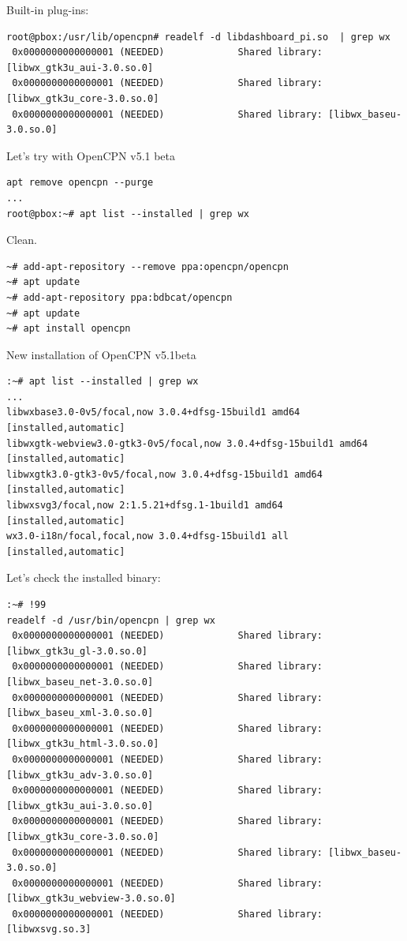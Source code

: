 \documentclass[11pt]{article}
\begin{document}
    Built-in plug-ins:

    \begin{verbatim}
root@pbox:/usr/lib/opencpn# readelf -d libdashboard_pi.so  | grep wx
 0x0000000000000001 (NEEDED)             Shared library: [libwx_gtk3u_aui-3.0.so.0]
 0x0000000000000001 (NEEDED)             Shared library: [libwx_gtk3u_core-3.0.so.0]
 0x0000000000000001 (NEEDED)             Shared library: [libwx_baseu-3.0.so.0]
\end{verbatim}

    Let's try with OpenCPN v5.1 beta

    \begin{verbatim}
apt remove opencpn --purge
...
root@pbox:~# apt list --installed | grep wx
\end{verbatim}

Clean.

    \begin{verbatim}
~# add-apt-repository --remove ppa:opencpn/opencpn
~# apt update
~# add-apt-repository ppa:bdbcat/opencpn
~# apt update
~# apt install opencpn
\end{verbatim}

    New installation of OpenCPN v5.1beta

    \begin{verbatim}
:~# apt list --installed | grep wx
...
libwxbase3.0-0v5/focal,now 3.0.4+dfsg-15build1 amd64 [installed,automatic]
libwxgtk-webview3.0-gtk3-0v5/focal,now 3.0.4+dfsg-15build1 amd64 [installed,automatic]
libwxgtk3.0-gtk3-0v5/focal,now 3.0.4+dfsg-15build1 amd64 [installed,automatic]
libwxsvg3/focal,now 2:1.5.21+dfsg.1-1build1 amd64 [installed,automatic]
wx3.0-i18n/focal,focal,now 3.0.4+dfsg-15build1 all [installed,automatic]
\end{verbatim}

    Let's check the installed binary:

    \begin{verbatim}
:~# !99
readelf -d /usr/bin/opencpn | grep wx
 0x0000000000000001 (NEEDED)             Shared library: [libwx_gtk3u_gl-3.0.so.0]
 0x0000000000000001 (NEEDED)             Shared library: [libwx_baseu_net-3.0.so.0]
 0x0000000000000001 (NEEDED)             Shared library: [libwx_baseu_xml-3.0.so.0]
 0x0000000000000001 (NEEDED)             Shared library: [libwx_gtk3u_html-3.0.so.0]
 0x0000000000000001 (NEEDED)             Shared library: [libwx_gtk3u_adv-3.0.so.0]
 0x0000000000000001 (NEEDED)             Shared library: [libwx_gtk3u_aui-3.0.so.0]
 0x0000000000000001 (NEEDED)             Shared library: [libwx_gtk3u_core-3.0.so.0]
 0x0000000000000001 (NEEDED)             Shared library: [libwx_baseu-3.0.so.0]
 0x0000000000000001 (NEEDED)             Shared library: [libwx_gtk3u_webview-3.0.so.0]
 0x0000000000000001 (NEEDED)             Shared library: [libwxsvg.so.3]
\end{verbatim}
\end{document}
